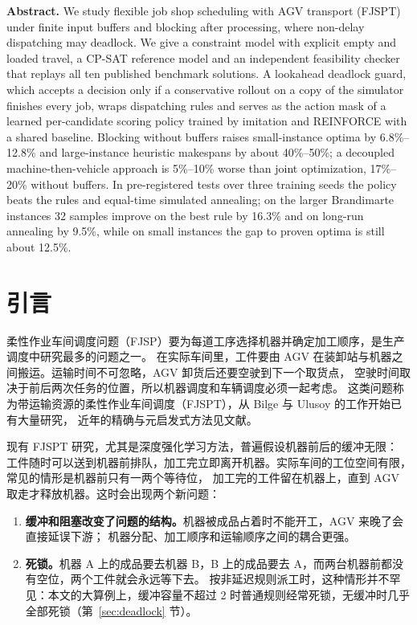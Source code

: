 \documentclass[11pt,a4paper]{ctexart}
\theoremstyle{definition}
\theoremstyle{remark}
\begin{document}
\begin{center}
\begin{minipage}{0.9\textwidth}
\small\textbf{Abstract.}
We study flexible job shop scheduling with AGV transport (FJSPT) under finite input buffers and blocking after processing,
where non-delay dispatching may deadlock. We give a constraint model with explicit empty and loaded travel, a CP-SAT reference
model and an independent feasibility checker that replays all ten published benchmark solutions. A lookahead deadlock guard,
which accepts a decision only if a conservative rollout on a copy of the simulator finishes every job, wraps dispatching rules
and serves as the action mask of a learned per-candidate scoring policy trained by imitation and REINFORCE with a shared baseline.
Blocking without buffers raises small-instance optima by 6.8\%--12.8\% and large-instance heuristic makespans by about 40\%--50\%;
a decoupled machine-then-vehicle approach is 5\%--10\% worse than joint optimization, 17\%--20\% without buffers.
In pre-registered tests over three training seeds the policy beats the rules and equal-time simulated annealing; on the larger
Brandimarte instances 32 samples improve on the best rule by 16.3\% and on long-run annealing by 9.5\%, while on small instances
the gap to proven optima is still about 12.5\%.
\end{minipage}
\end{center}

\section{引言}

柔性作业车间调度问题（FJSP）要为每道工序选择机器并确定加工顺序，是生产调度中研究最多的问题之一\cite{dauzere2024}。
在实际车间里，工件要由 AGV 在装卸站与机器之间搬运。运输时间不可忽略，AGV 卸货后还要空驶到下一个取货点，
空驶时间取决于前后两次任务的位置，所以机器调度和车辆调度必须一起考虑。
这类问题称为带运输资源的柔性作业车间调度（FJSPT），从 Bilge 与 Ulusoy 的工作\cite{bilge1995}开始已有大量研究，
近年的精确与元启发式方法见文献\cite{homayouni2021,berterottiere2024}。

现有 FJSPT 研究，尤其是深度强化学习方法\cite{link2026,hadqn2025,wang2024}，普遍假设机器前后的缓冲无限：
工件随时可以送到机器前排队，加工完立即离开机器。实际车间的工位空间有限，常见的情形是机器前只有一两个等待位，
加工完的工件留在机器上，直到 AGV 取走才释放机器。这时会出现两个新问题：
\begin{enumerate}[nosep]
  \item \textbf{缓冲和阻塞改变了问题的结构。}机器被成品占着时不能开工，AGV 来晚了会直接延误下游；
        机器分配、加工顺序和运输顺序之间的耦合更强。
  \item \textbf{死锁。}机器 A 上的成品要去机器 B，B 上的成品要去 A，而两台机器前都没有空位，两个工件就会永远等下去。
        按非延迟规则派工时，这种情形并不罕见：本文的大算例上，缓冲容量不超过 2 时普通规则经常死锁，无缓冲时几乎全部死锁（第~\ref{sec:deadlock} 节）。
\end{enumerate}
\end{document}
